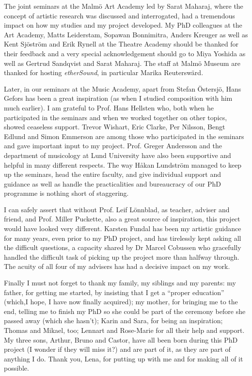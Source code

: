 The joint seminars at the Malm\"{o} Art Academy led by Sarat Maharaj, where the concept of artistic research was discussed and interrogated, had a tremendous impact on how my studies and my project developed. My PhD colleagues at the Art Academy, Matts Leiderstam, Sopawan Bonnimitra, Anders Kreuger as well as Kent Sj\"{o}str\"{o}m and Erik Rynell at the Theatre Academy should be thanked for their feedback and a very special acknowledgement should go to Miya Yoshida as well as Gertrud Sandqvist and Sarat Maharaj. The staff at Malm\"{o} Museum are thanked for hosting \emph{etherSound}, in particular Marika Reutersw\"{a}rd.

Later, in our seminars at the Music Academy, apart from Stefan \"{O}stersj\"{o}, Hans Gefors has been a great inspiration (as when I studied composition with him much earlier). I am grateful to Prof. Hans Hellsten who, both when he participated in the seminars and when we worked together on other topics, showed ceaseless support. Trevor Wishart, Eric Clarke, Per Nilsson, Bengt Edlund and Simon Emmerson are among those who participated in the seminars and gave important input to my project. Prof. Greger Andersson and the department of musicology at Lund University have also been supportive and helpful in many different respects. The way H{\aa}kan Lundstr\"{o}m managed to keep up the seminars, head the entire faculty, and give individual support and guidance as well as handle the practicalities and bureaucracy of our PhD programme is nothing short of staggering.

I can safely assert that without Prof. Leif L\"{o}nnblad, as teacher, adviser and friend, and Prof. Miller Puckette, also a great source of inspiration, this project would have looked very different. Karsten Fundal has been my artistic guidance for many years, even prior to my PhD project, and has tirelessly kept asking all the difficult questions, a capacity shared by Dr Marcel Cobussen who gracefully handled the difficult task of picking up the project more than halfway through. The acuity of all four of my advisers has had a decisive impact on my work.

Finally I must not forget to thank my family, my siblings and my parents: my father, for getting me started, by insisting that I get a ``proper education'' (which,I hope, I have now finally acquired); my mother, for bringing me to the end, telling me to finish my PhD so she could be part of the ceremony before she passed away (which she hasn't); Karin and Sara, for being an inspiration; Thomas and Mikael, too; Lennart and Rose-Marie for all their help and support. My three sons, Arthur, Bruno and Castor, have all been born during this PhD project (I wonder if they will miss it?) and are part of it, as they are part of anything I do. Thank you, Lena, for putting up with me and for making all of it possible.

